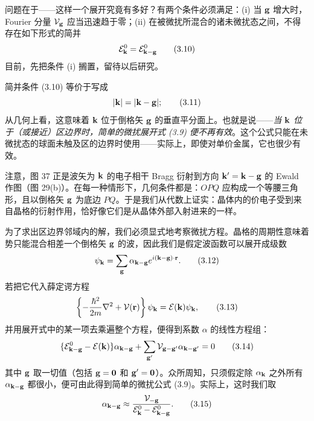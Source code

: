 问题在于——这样一个展开究竟有多好？有两个条件必须满足：(i) 当 ${\bf g}$ 增大时，Fourier 分量 $\mathcal{V}_{\bf g}$ 应当迅速趋于零；(ii) 在被微扰所混合的诸未微扰态之间，不得存在如下形式的简并
\begin{equation*}
\mathcal{E}_{\bf k}^{0}=\mathcal{E}_{\bf k-{\bf g}}^{0}
\tag{3.10}
\end{equation*}
目前，先把条件 (i) 搁置，留待以后研究。

简并条件 (3.10) 等价于写成
\begin{equation*}
|{\bf k}|=|{\bf k}-{\bf g}|;
\tag{3.11}
\end{equation*}
从几何上看，这意味着 ${\bf k}$ 位于倒格矢 ${\bf g}$ 的垂直平分面上。也就是说——\emph{当 ${\bf k}$ 位于（或接近）区边界时，简单的微扰展开式 (3.9) 便不再有效}。这个公式只能在未微扰态的球面未触及区的边界时使用——实际上，即使对单价金属，它也很少有效。


注意，图 37 正是波矢为 ${\bf k}$ 的电子相干 Bragg 衍射到方向 ${\bf k}'={\bf k}-{\bf g}$ 的 Ewald 作图（图 29(b)）。在每一种情形下，几何条件都是：$OPQ$ 应构成一个等腰三角形，且以倒格矢 ${\bf g}$ 为底边 $PQ$。于是我们从代数上证实：晶体内的价电子受到来自晶格的衍射作用，恰好像它们是从晶体外部入射进来的一样。

为了求出区边界邻域内的解，我们必须显式地考察微扰方程。晶格的周期性意味着势只能混合相差一个倒格矢 ${\bf g}$ 的波，因此我们是假定波函数可以展开成级数
\begin{equation*}
\psi_{\bf k}=\sum_{\bf g}\alpha_{\bf k-{\bf g}}e^{i({\bf k}-{\bf g})\cdot{\bf r}}.
\tag{3.12}
\end{equation*}
若把它代入薛定谔方程
\begin{equation*}
\left\{-\frac{\hbar^{2}}{2m}\nabla^{2}+\mathcal{V}(\mathbf{r})\right\}\psi_{\bf k}=\mathcal{E}({\bf k})\psi_{\bf k},
\tag{3.13}
\end{equation*}
并用展开式中的某一项去乘遍整个方程，便得到系数 $\alpha$ 的线性方程组：
\begin{equation*}
\{\mathcal{E}_{\bf k-{\bf g}}^{0}-\mathcal{E}({\bf k})\}\alpha_{\bf k-{\bf g}}+\sum_{{\bf g}'}\mathcal{V}_{{\bf g}-{\bf g}'}\alpha_{\bf k-{\bf g}'}=0
\tag{3.14}
\end{equation*}
其中 ${\bf g}$ 取一切值（包括 ${\bf g}={\bf 0}$ 和 ${\bf g}'={\bf 0}$）。众所周知，只须假定除 $\alpha_{\bf k}$ 之外所有 $\alpha_{\bf k-{\bf g}}$ 都很小，便可由此得到简单的微扰公式 (3.9)。实际上，这时我们取
\begin{equation*}
\alpha_{\bf k-{\bf g}}\approx\frac{\mathcal{V}_{-{\bf g}}}{\mathcal{E}_{\bf k}^{0}-\mathcal{E}_{\bf k-{\bf g}}^{0}}.
\tag{3.15}
\end{equation*}

